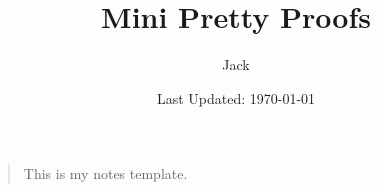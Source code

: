 \documentclass[letterpaper, 11pt, colorful, sections, nodate]{sizzle}
\title{Mini Pretty Proofs}
\author{Jack}
\date{Last Updated: \today}
\numberwithin{equation}{section}
\begin{document}
\maketitle
\begin{quote}
    This is my notes template.
\end{quote}
\tableofcontents

\newpage





\end{document}
